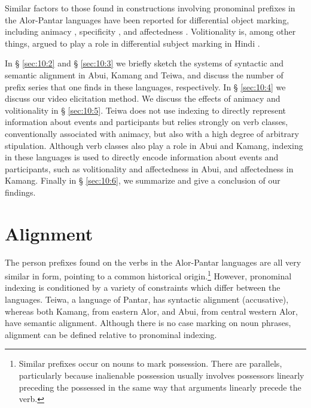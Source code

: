 Similar factors to those found in constructions involving pronominal prefixes in the Alor-Pantar languages have been reported for differential object marking, including animacy \citep{Bossong1991,Croft1988,Aissen2003}, specificity \citep{VonHeusingerEtAl2005}, and affectedness \citep{HopperEtAl1980,Tsunoda1981,Tsunoda1985,VonHeusingerEtAl2011}. Volitionality is, among other things, argued to play a role in differential subject marking in Hindi \citep{Mohanan1990}.

In {\S} \ref{sec:10:2} and {\S} \ref{sec:10:3} we briefly sketch the systems of syntactic and semantic alignment in Abui, Kamang and Teiwa, and discuss the number of prefix series that one finds in these languages, respectively. In {\S} \ref{sec:10:4} we discuss our video elicitation method. We discuss the effects of animacy and volitionality in {\S} \ref{sec:10:5}. Teiwa does not use indexing to directly represent information about events and participants but relies strongly on verb classes, conventionally associated with animacy, but also with a high degree of arbitrary stipulation. Although verb classes also play a role in Abui and Kamang, indexing in these languages is used to directly encode information about events and participants, such as volitionality and affectedness in Abui, and affectedness in Kamang. Finally in {\S} \ref{sec:10:6}, we summarize and give a conclusion of our findings.

\section{Alignment}
\label{sec:10:2}
The person prefixes found on the verbs in the Alor-Pantar languages are all very similar in form, pointing to a common historical origin.\footnote{Similar prefixes occur on nouns to mark possession. There are parallels, particularly because inalienable possession usually involves possessors linearly preceding the possessed in the same way that arguments linearly precede the verb.} However, pronominal indexing is conditioned by a variety of constraints which differ between the languages. Teiwa, a language of Pantar, has syntactic alignment (accusative), whereas both Kamang, from eastern Alor, and Abui, from central western Alor, have semantic alignment. Although there is no case marking on noun phrases, alignment can be defined relative to pronominal indexing. 

